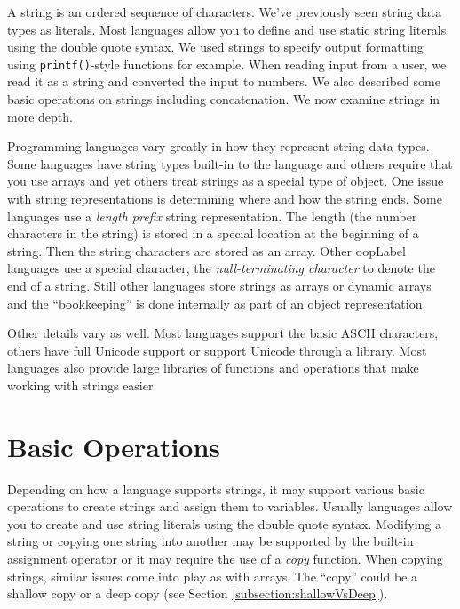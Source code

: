 

A \gls{string} is an ordered sequence of characters.
We've previously seen string data types as literals.  Most 
languages allow you to define and use static string literals
using the double quote syntax.  We used strings to specify
output formatting using \texttt{printf()}-style functions
for example.  When reading input from a user, we read it
as a string and converted the input to numbers.  We also
described some basic operations on strings including 
concatenation.  We now examine strings in more depth.  

Programming languages vary greatly in how they represent
string data types.  Some languages have string types
built-in to the language and others require that you use
arrays and yet others treat strings as a special type of
object.  One issue with string representations is determining where
and how the string ends.  Some languages use a \emph{length
prefix} string representation.  The length (the number
characters in the string) is stored in a special location at
the beginning of a string.  Then the string characters are
stored as an array.  Other \gls{oopLabel} languages use a special
character, the \emph{null-terminating character} to denote
the end of a string.  Still other languages store strings
as arrays or dynamic arrays and the ``bookkeeping''
is done internally as part of an object representation.

Other details vary as well.  Most languages support the
basic ASCII characters, others have full Unicode support
or support Unicode through a library.  Most languages
also provide large libraries of functions and operations
that make working with strings easier.

\section{Basic Operations}

Depending on how a language supports strings, it may
support various basic operations to create strings and
assign them to variables.  Usually languages allow you
to create and use string literals using the double quote 
syntax.  Modifying a string or copying one string into 
another may be supported by the built-in assignment
operator or it may require the use of a \emph{copy}
function.  When copying strings, similar issues come 
into play as with arrays.  The ``copy'' could be a shallow
copy or a deep copy (see Section \ref{subsection:shallowVsDeep}).


